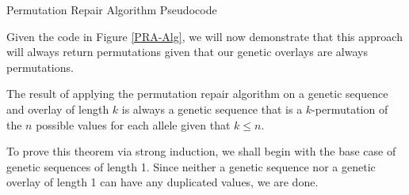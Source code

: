 %
%
\begin{algorithm}
	\SetAlgoLined
	\BlankLine

	
	\BlankLine

	\caption{Permutation Repair Algorithm Pseudocode}
	\label{PRA-Alg}
\end{algorithm}

Given the code in Figure \ref{PRA-Alg}, we will now demonstrate that this approach will always return permutations given that our genetic overlays are always permutations.

\begin{thm}
The result of applying the permutation repair algorithm on a genetic sequence and overlay of length $k$ is always a genetic sequence that is a $k$-permutation of the $n$ possible values for each allele given that $ k \leq n$.
\end{thm}

To prove this theorem via strong induction, we shall begin with the base case of genetic sequences of length 1. Since neither a genetic sequence nor a genetic overlay of length 1 can have any duplicated values, we are done. 

